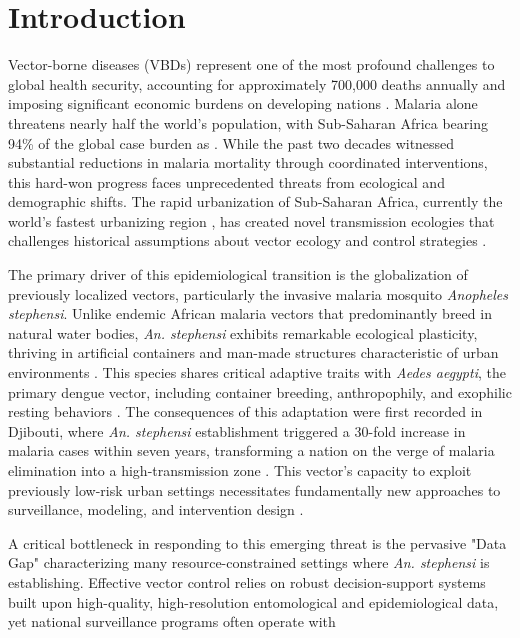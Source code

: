 \documentclass{article}
\begin{document}
\section{Introduction}
\label{sec:introduction}
\par
Vector-borne diseases (VBDs) represent one of the most profound challenges to global health security, accounting for 
approximately 700,000 deaths annually and imposing significant economic burdens on developing nations \citep{2025.RL.HMD}. 
Malaria alone threatens nearly half the world's population, with Sub-Saharan Africa bearing 94\% of the global case burden 
as \citep{2024.WH.WWM}. While the past two decades witnessed substantial reductions in malaria mortality through coordinated 
interventions, this hard-won progress faces unprecedented threats from ecological and demographic shifts. 
The rapid urbanization of Sub-Saharan Africa, currently the world's fastest urbanizing region \citep{2019.IS.UAI}, 
has created novel transmission ecologies that challenges historical assumptions about vector ecology and control 
strategies \citep{2024.NK.MBD}.
\par
The primary driver of this epidemiological transition is the globalization of previously localized vectors, particularly 
the invasive malaria mosquito \textit{Anopheles stephensi}. Unlike endemic African malaria vectors that predominantly 
breed in natural water bodies, \textit{An. stephensi} exhibits remarkable ecological plasticity, thriving in artificial 
containers and man-made structures characteristic of urban environments \citep{2025.GC.SAB}. This species shares critical 
adaptive traits with \textit{Aedes aegypti}, the primary dengue vector, including container breeding, anthropophily, and 
exophilic resting behaviors \citep{2022.AH.TPI}. The consequences of this adaptation were first recorded in Djibouti, 
where\textit{ An. stephensi} establishment triggered a 30-fold increase in malaria cases within seven years, transforming a 
nation on the verge of malaria elimination into a high-transmission zone \citep{2022.AH.TPI}. This vector's capacity to exploit 
previously low-risk urban settings necessitates fundamentally new approaches to surveillance, modeling, and 
intervention design \citep{2024.TM.AQA}.
\par
A critical bottleneck in responding to this emerging threat is the pervasive "Data Gap" characterizing many resource-constrained 
settings where \textit{An. stephensi} is establishing. Effective vector control relies on robust decision-support systems built 
upon high-quality, high-resolution entomological and epidemiological data, yet national surveillance programs often operate with 
\end{document}

